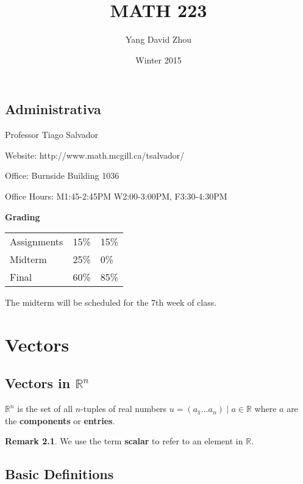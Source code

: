 \documentclass{report}
\theoremstyle{definition}
\newtheorem{_rem}{Remark}
\begin{document}
 
\title{MATH 223} 
\author{Yang David Zhou}
\date{Winter 2015}
\maketitle

\section{Administrativa}

\raggedright

Professor Tiago Salvador \newline

Website: http://www.math.mcgill.ca/tsalvador/ \newline

Office: Burnside Building 1036

Office Hours: M1:45-2:45PM W2:00-3:00PM, F3:30-4:30PM \newline

\textbf{Grading}

\begin{tabular}{ l l l }
  Assignments & 15\% & 15\% \\
  Midterm     & 25\% &  0\% \\
  Final       & 60\% & 85\% \\
\end{tabular} \newline

The midterm will be scheduled for the 7th week of class.

\chapter{Vectors}

\section{Vectors in \(\mathbb{R}^n\)}

\(\mathbb{R}^n\) is the set of all \(n\)-tuples of real numbers \(u=(a_1 ... a_n) \mid a\in \mathbb{R}\) where \(a\) are the \textbf{components} or \textbf{entries}.

\begin{_rem}
We use the term \textbf{scalar} to refer to an element in \(\mathbb{R}\).
\end{_rem}

\section{Basic Definitions}
\end{document}
